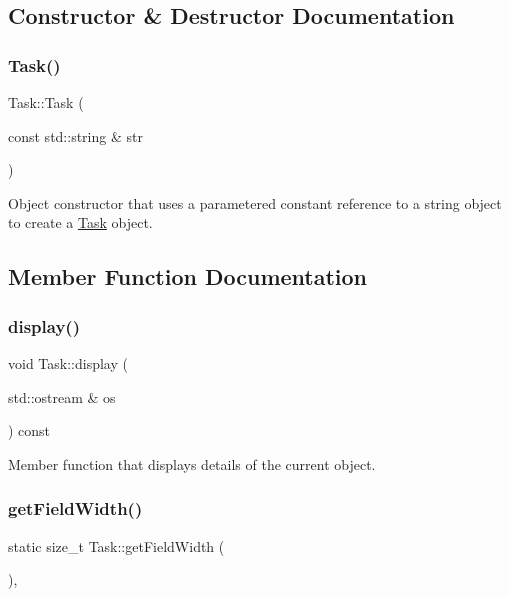 \subsection{Constructor \& Destructor Documentation}
\mbox{\label{classTask_ace3ff25451f6d46f6cc0f2d7ed4b16ef}} 
\subsubsection{\texorpdfstring{Task()}{Task()}}
{\footnotesize\ttfamily Task\+::\+Task (\begin{DoxyParamCaption}\item[{const std\+::string \&}]{str }\end{DoxyParamCaption})}

Object constructor that uses a parametered constant reference to a string object to create a \mbox{\hyperlink{classTask}{Task}} object. 

\subsection{Member Function Documentation}
\mbox{\label{classTask_aff00aecd7c14bd02434b76ad10a656a2}} 
\subsubsection{\texorpdfstring{display()}{display()}}
{\footnotesize\ttfamily void Task\+::display (\begin{DoxyParamCaption}\item[{std\+::ostream \&}]{os }\end{DoxyParamCaption}) const}

Member function that displays details of the current object. \mbox{\label{classTask_a18f265f8b4a37e5ed047034c2558068b}} 
\subsubsection{\texorpdfstring{get\+Field\+Width()}{getFieldWidth()}}
{\footnotesize\ttfamily static size\+\_\+t Task\+::get\+Field\+Width (\begin{DoxyParamCaption}{ }\end{DoxyParamCaption})\hspace{0.3cm}{\ttfamily [inline]}, {\ttfamily [static]}}

